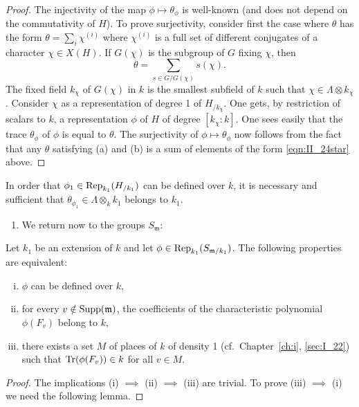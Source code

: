 \begin{proof}
	The injectivity of the map $\phi \mapsto \theta_\phi$ is
	well-known (and does not depend on the commutativity of $H$). To prove
	surjectivity, consider first the case where $\theta$ has the form
	$\theta = \sum_{i} \chi^{(i)}$ where $\chi^{(i)}$ is a full set of
	different conjugates of a character $\chi \in X(H)$. If $G(\chi)$ is
	the subgroup of $G$ fixing $\chi$, then
	\begin{equation}
		\theta = \sum_{s \in G/G(\chi)} s(\chi).
		\tag{$*$}
		\label{eqn:II_24star}
	\end{equation}
	The fixed field $k_\chi$ of $G(\chi)$ in $k$ is the smallest subfield
	of $k$ such that $\chi \in \Lambda \otimes k_\chi$. Consider $\chi$ as
	a representation of degree 1 of $H_{/k_\chi}$. One gets, by restriction
	of scalars to $k$, a representation
	\dpage
	$\phi$ of $H$ of degree $[k_\chi : k]$. One sees easily that the
	trace $\theta_\phi$ of $\phi$ is equal to $\theta$. The
	surjectivity of $\phi \mapsto \theta_\phi$ now follows from the
	fact that any $\theta$ satisfying (a) and (b) is a sum of elements of
	the form \eqref{eqn:II_24star} above.
\end{proof}

\begin{corp}
In order that $\phi_1 \in \operatorname{Rep}_{k_1}(H_{/k_1})$ can be defined over $k$, it
is necessary and sufficient that $\theta_{\phi_1} \in \Lambda \otimes_k k_1$
belongs to $k_1$.
\end{corp}

\begin{enumerate}[resume*]
	\item We return now to the groups $S_{\mathfrak{m}}$:
\end{enumerate}
\begin{prop}
Let $k_1$ be an extension of $k$ and let $\phi \in
\operatorname{Rep}_{k_1}(S_{\mathfrak{m} /k_1})$. The following properties are equivalent:
\begin{enumerate}[(i)]
\item $\phi$ can be defined over $k$,
\item for every $v \notin \operatorname{Supp}(\mathfrak{m})$, the coefficients of the
	characteristic polynomial $\phi(F_v)$ belong to $k$,
\item there exists a set $M$ of places of $k$ of density 1 (cf.\ 
	Chapter~\ref{ch:i}, \ref{sec:I_22}) such that $\operatorname{Tr}(\phi(F_v)) \in k$
	for all $v \in M$.
\end{enumerate}
\end{prop}
\begin{proof}
The implications (i) $\implies$ (ii) $\implies$ (iii) are trivial.
To prove (iii) $\implies$ (i) we need the following lemma.
\end{proof}


